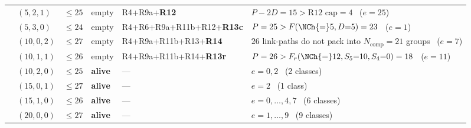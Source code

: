 \begin{table}[htbp]
\begin{tabular}{@{}clcl>{\raggedright\arraybackslash}p{29mm}>{\raggedright\arraybackslash}p{51mm}@{}}
 & $(5,2,1)$ & $\le25$ & empty & R4+\allowbreak R9a+\allowbreak \textbf{R12} & $P-2D=15>\text{R12 cap}=4$ \ ($e=25$)\\
 & $(5,3,0)$ & $\le24$ & empty & R4+\allowbreak R6+\allowbreak R9a+\allowbreak R11b+\allowbreak R12+\allowbreak \textbf{R13c} & $P=25>F(\NCh{=}5,D{=}5)=23$ \ ($e=1$)\\
 & $(10,0,2)$ & $\le27$ & empty & R4+\allowbreak R9a+\allowbreak R11b+\allowbreak R13+\allowbreak \textbf{R14} & $26$ link-paths do not pack into $N_{\mathrm{comp}}{=}21$ groups \ ($e=7$)\\
 & $(10,1,1)$ & $\le26$ & empty & R4+\allowbreak R9a+\allowbreak R11b+\allowbreak R14+\allowbreak \textbf{R13r} & $P=26>F_r(\NCh{=}12,S_5{=}10,S_4{=}0)=18$ \ ($e=11$)\\
 & $(10,2,0)$ & $\le25$ & \textbf{alive} & --- & $e=0,2$ \ (2 classes)\\
 & $(15,0,1)$ & $\le27$ & \textbf{alive} & --- & $e=2$ \ (1 class)\\
 & $(15,1,0)$ & $\le26$ & \textbf{alive} & --- & $e=0,\dots,4,7$ \ (6 classes)\\
 & $(20,0,0)$ & $\le27$ & \textbf{alive} & --- & $e=1,\dots,9$ \ (9 classes)\\
\bottomrule
\end{tabular}
\end{table}

